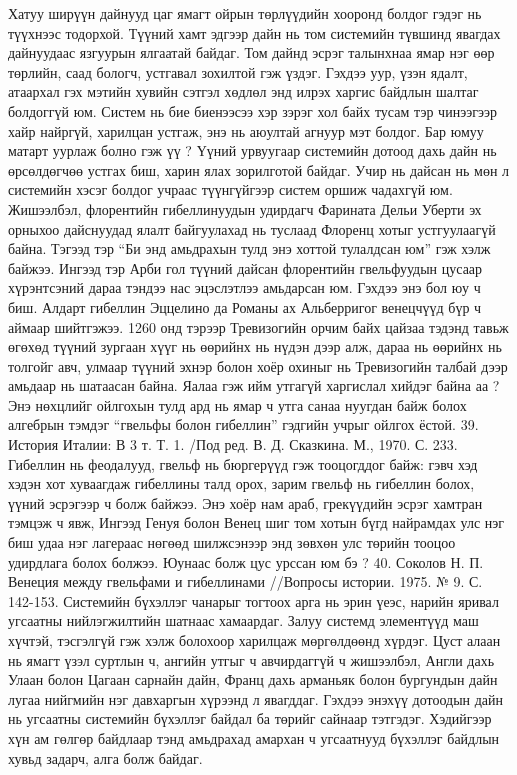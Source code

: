 Хатуу ширүүн дайнууд цаг ямагт ойрын төрлүүдийн хооронд болдог гэдэг нь түүхнээс тодорхой. Түүний хамт эдгээр дайн нь том системийн түвшинд явагдах дайнуудаас язгуурын ялгаатай байдаг. Том дайнд эсрэг талынхнаа ямар нэг өөр төрлийн, саад бологч, устгавал зохилтой гэж үздэг. Гэхдээ уур, үзэн ядалт, атаархал гэх мэтийн хувийн сэтгэл хөдлөл энд илрэх харгис байдлын шалтаг болдоггүй юм. Систем нь бие биенээсээ хэр зэрэг хол байх тусам тэр чинээгээр хайр найргүй, харилцан устгаж, энэ нь аюултай агнуур мэт болдог. Бар юмуу матарт уурлаж болно гэж үү ? Үүний урвуугаар системийн дотоод дахь дайн нь өрсөлдөгчөө устгах биш, харин ялах зорилготой байдаг. Учир нь дайсан нь мөн л системийн хэсэг болдог учраас түүнгүйгээр систем оршиж чадахгүй юм. Жишээлбэл, флорентийн гибеллинуудын удирдагч Фарината Дельи Уберти эх орныхоо дайснуудад ялалт байгуулахад нь туслаад Флоренц хотыг устгуулаагүй байна. Тэгээд тэр “Би энд амьдрахын тулд энэ хоттой тулалдсан юм” гэж хэлж байжээ. Ингээд тэр Арби гол түүний дайсан флорентийн гвельфуудын цусаар хүрэнтсэний дараа тэндээ нас эцэслэтлээ амьдарсан юм.
Гэхдээ энэ бол юу ч биш. Алдарт гибеллин Эццелино да Романы ах Альберригог венецчүүд бүр ч аймаар шийтгэжээ. 1260 онд тэрээр Тревизогийн орчим байх цайзаа тэдэнд тавьж өгөхөд түүний зургаан хүүг нь өөрийнх нь нүдэн дээр алж, дараа нь өөрийнх нь толгойг авч, улмаар түүний эхнэр болон хоёр охиныг нь Тревизогийн талбай дээр амьдаар нь шатаасан байна. Яалаа гэж ийм утгагүй харгислал хийдэг байна аа ?
Энэ нөхцлийг ойлгохын тулд ард нь ямар ч утга санаа нуугдан байж болох алгебрын тэмдэг “гвельфы болон гибеллин” гэдгийн учрыг ойлгох ёстой. 39. История Италии: В 3 т. Т. 1. /Под ред. В. Д. Сказкина. М., 1970. С. 233. Гибеллин нь феодалууд, гвельф нь бюргерүүд гэж тооцогддог байж: гэвч хэд хэдэн хот хуваагдаж гибеллины талд орох, зарим гвельф нь гибеллин болох, үүний эсрэгээр ч болж байжээ. Энэ хоёр нам араб, грекүүдийн эсрэг хамтран тэмцэж ч явж, Ингээд Генуя болон Венец шиг том хотын бүгд найрамдах улс нэг биш удаа нэг лагераас нөгөөд шилжсэнээр энд зөвхөн улс төрийн тооцоо удирдлага болох болжээ. Юунаас болж цус урссан юм бэ ? 40. Соколов Н. П. Венеция между гвельфами и гибеллинами //Вопросы истории. 1975. № 9. С. 142-153.
Системийн бүхэллэг чанарыг тогтоох арга нь эрин үеэс, нарийн яривал угсаатны нийлэгжилтийн шатнаас хамаардаг. Залуу системд элементүүд маш хүчтэй, тэсгэлгүй гэж хэлж болохоор харилцаж мөргөлдөөнд хүрдэг. Цуст алаан нь ямагт үзэл суртлын ч, ангийн утгыг ч авчирдаггүй ч жишээлбэл, Англи дахь Улаан болон Цагаан сарнайн дайн, Франц дахь арманьяк болон бургундын дайн лугаа нийгмийн нэг давхаргын хүрээнд л явагддаг. Гэхдээ энэхүү дотоодын дайн нь угсаатны системийн бүхэллэг байдал ба төрийг сайнаар тэтгэдэг. Хэдийгээр хүн ам гөлгөр байдлаар тэнд амьдрахад амархан ч угсаатнууд бүхэллэг байдлын хувьд задарч, алга болж байдаг.
